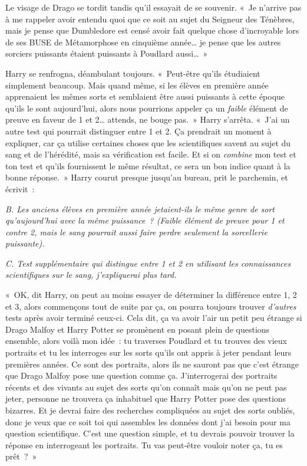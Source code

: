 Le visage de Drago se tordit tandis qu'il essayait de se souvenir.
«~Je n'arrive pas à me rappeler avoir entendu quoi que ce soit au sujet du Seigneur des Ténèbres, mais je pense que Dumbledore est censé avoir fait quelque chose d'incroyable lors de ses BUSE de Métamorphose en cinquième année… je pense que les autres sorciers puissants étaient puissants à Poudlard aussi…~»

Harry se renfrogna, déambulant toujours.
«~Peut-être qu'ils étudiaient simplement beaucoup.
Mais quand même, si les élèves en première année apprenaient les mêmes sorts et semblaient être aussi puissants à cette époque qu'ils le sont aujourd'hui, alors nous pourrions appeler ça un \emph{faible} élément de preuve en faveur de 1 et 2… attends, ne bouge pas.~»
Harry s'arrêta.
«~J'ai un autre test qui pourrait distinguer entre 1 et 2.
Ça prendrait un moment à expliquer, car ça utilise certaines choses que les scientifiques savent au sujet du sang et de l'hérédité, mais sa vérification est facile.
Et si on \emph{combine} mon test et ton test et qu'ils fournissent le même résultat, ce sera un bon indice quant à la bonne réponse.~»
Harry courut presque jusqu'au bureau, prit le parchemin, et écrivit~:

\emph{B.
Les anciens élèves en première année jetaient-ils le même genre de sort qu'aujourd'hui avec la même puissance~?
(Faible élément de preuve pour 1 et contre 2, mais le sang pourrait aussi faire perdre seulement la sorcellerie puissante).}

\emph{C.
Test supplémentaire qui distingue entre 1 et 2 en utilisant les connaissances scientifiques sur le sang, j'expliquerai plus tard.}

«~OK, dit Harry, on peut au moins essayer de déterminer la différence entre 1, 2 et 3, alors commençons tout de suite par ça, on pourra toujours trouver \emph{d'autres} tests après avoir terminé ceux-ci.
Cela dit, ça va avoir l'air un petit peu étrange si Drago Malfoy et Harry Potter se promènent en posant plein de questions ensemble, alors voilà mon idée~: tu traverses Poudlard et tu trouves des vieux portraits et tu les interroges sur les sorts qu'ils ont appris à jeter pendant leurs premières années.
Ce sont des portraits, alors ils ne sauront pas que c'est étrange que Drago Malfoy pose une question comme ça.
J'interrogerai des portraits récents et des vivants au sujet des sorts qu'on connaît mais qu'on ne peut pas jeter, personne ne trouvera ça inhabituel que Harry Potter pose des questions bizarres.
Et je devrai faire des recherches compliquées au sujet des sorts oubliés, donc je veux que ce soit toi qui assembles les données dont j'ai besoin pour ma question scientifique.
C'est une question simple, et tu devrais pouvoir trouver la réponse en interrogeant les portraits.
Tu vas peut-être vouloir noter ça, tu es prêt~?~»

